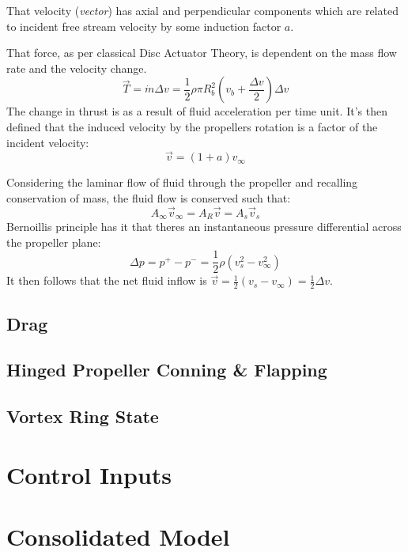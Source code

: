 That velocity (\emph{vector}) has axial and perpendicular components which are related to incident free stream velocity by some induction factor $a$.

That force, as per classical Disc Actuator Theory\cite{.}, is dependent on the mass flow rate and the velocity change.
\begin{equation}
\vec{T}=\dot{m}\Delta v=\frac{1}{2} \rho \pi R_b^2 (v_b+\frac{\Delta v}{2})\Delta v
\end{equation}
The change in thrust is as a result of fluid acceleration per time unit. It's then defined that the induced velocity by the propellers rotation is a factor of the incident velocity:
\begin{equation}
\vec{v}=(1+a)v_\infty
\end{equation}







Considering the laminar flow of fluid through the propeller and recalling conservation of mass, the fluid flow is conserved such that:
\begin{equation}
A_\infty \vec{v}_\infty=A_R\vec{v}=A_s\vec{v}_s
\end{equation}
Bernoillis principle has it that theres an instantaneous pressure differential across the propeller plane:
\begin{equation}
\Delta p = p^+ - p^- = \frac{1}{2}\rho(v_s^2-v_\infty^2)
\end{equation}
It then follows that the net fluid inflow is $\vec{v}=\frac{1}{2}(v_s-v_\infty)=\frac{1}{2}\Delta v$.

\subsection{Drag}
\label{subsec:dynamics.aero.drag}
\subsection{Hinged Propeller Conning \& Flapping}
\label{subsec:dynamics.aero.flap}
\subsection{Vortex Ring State}
\label{subsec:dynamics.aero.vrs}
\section{Control Inputs}
\section{Consolidated Model}
\label{sec:dynamics.model}%